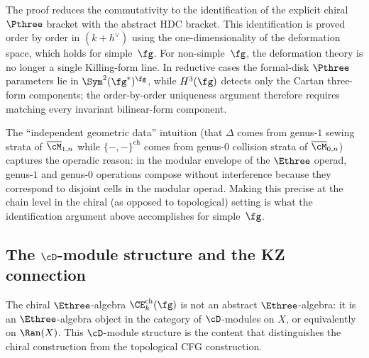 \begin{remark}
\label{rem:bv-p3-chain-level}
The proof reduces the commutativity to the identification
of the explicit chiral $\Pthree$ bracket with the abstract
HDC bracket. This identification is proved order by order
in $(k+h^\vee)$ using the one-dimensionality of the
deformation space, which holds for simple~$\fg$.
For non-simple~$\fg$, the deformation theory is no longer a
single Killing-form line. In reductive cases the formal-disk
$\Pthree$ parameters lie in
$\Sym^2(\fg^*)^\fg$, while $H^3(\fg)$ detects only the
Cartan three-form components; the order-by-order uniqueness
argument therefore requires matching every invariant
bilinear-form component.

The ``independent geometric data'' intuition (that
$\Delta$ comes from genus-$1$ sewing strata of
$\overline{\cM}_{1,n}$ while
$\{-,-\}^{\mathrm{ch}}$ comes from genus-$0$ collision
strata of $\overline{\cM}_{0,n}$) captures the operadic
reason: in the modular envelope of the $\Ethree$ operad,
genus-$1$ and genus-$0$ operations compose without
interference because they correspond to disjoint cells
in the modular operad. Making this precise at the
chain level in the chiral (as opposed to topological)
setting is what the identification argument above
accomplishes for simple~$\fg$.
\end{remark}


\subsection{The $\cD$-module structure and the KZ connection}
\label{subsec:chiral-e3-dmod}

The chiral $\Ethree$-algebra
$\CE^{\mathrm{ch}}_k(\fg)$ is not an abstract
$\Ethree$-algebra: it is an $\Ethree$-algebra object
in the category of $\cD$-modules on $X$, or equivalently
on $\Ran(X)$. This $\cD$-module structure is the content
that distinguishes the chiral construction from the
topological CFG construction.

